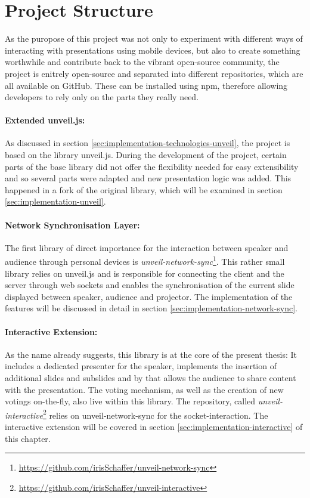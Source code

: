 \section{Project Structure}
\label{sec:implementation-structure}

As the puropose of this project was not only to experiment with different ways of interacting with presentations using mobile devices, but also to create something worthwhile and contribute back to the vibrant open-source community, the project is enitrely open-source and separated into different repositories, which are all available on GitHub. These can be installed using npm, therefore allowing developers to rely only on the parts they really need.

\paragraph{Extended unveil.js:} As discussed in section \ref{sec:implementation-technologies-unveil}, the project is based on the library unveil.js. During the development of the project, certain parts of the base library did not offer the flexibility needed for easy extensibility and so several parts were adapted and new presentation logic was added. This happened in a fork of the original library, which will be examined in section \ref{sec:implementation-unveil}.

\paragraph{Network Synchronisation Layer:} The first library of direct importance for the interaction between speaker and audience through personal devices is \textit{unveil-network-sync}\footnote{\url{https://github.com/irisSchaffer/unveil-network-sync}}. This rather small library relies on unveil.js and is responsible for connecting the client and the server through web sockets and enables the synchronisation of the current slide displayed between speaker, audience and projector. The implementation of the features will be discussed in detail in section \ref{sec:implementation-network-sync}.

\paragraph{Interactive Extension:} As the name already suggests, this library is at the core of the present thesis: It includes a dedicated presenter for the speaker, implements the insertion of additional slides and subslides and by that allows the audience to share content with the presentation. The voting mechanism, as well as the creation of new votings on-the-fly, also live within this library. The repository, called \emph{unveil-interactive}\footnote{\url{https://github.com/irisSchaffer/unveil-interactive}} relies on unveil-network-sync for the socket-interaction. The interactive extension will be covered in section \ref{sec:implementation-interactive} of this chapter.

